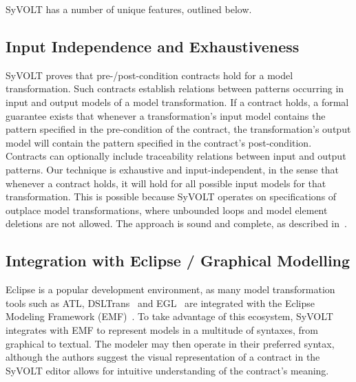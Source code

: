 SyVOLT has a number of unique features, outlined below.

\subsection{Input Independence and Exhaustiveness} 

SyVOLT proves that pre-/post-condition contracts hold for a model transformation.
Such contracts establish relations between patterns occurring in input and output
models of a model transformation. If a contract holds, a formal guarantee
exists that whenever a transformation's input model contains the pattern
specified in the pre-condition of the contract, the transformation's output model will contain
the pattern specified in the contract's post-condition. Contracts can 
optionally include traceability relations between input and output patterns. 
Our technique is exhaustive and input-independent, in the sense that whenever a contract holds, it
will hold for all possible input models for that transformation. This is possible
because SyVOLT operates on specifications of outplace model transformations,
where unbounded loops and model element deletions are not allowed. The approach is sound and complete, as described
in~\cite{Lucio2014}.




\subsection{Integration with Eclipse / Graphical Modelling}

Eclipse is a popular development environment, as many model transformation tools
such as ATL, DSLTrans~\cite{Barroca2011} and
EGL~\cite{eglTool} are integrated with the Eclipse
Modeling Framework (EMF)~\cite{emfTool}. To take
advantage of this ecosystem, SyVOLT integrates with EMF to represent models in a
multitude of syntaxes, from graphical to textual. The modeler may then operate
in their preferred syntax, although the authors suggest the visual
representation of a contract in the SyVOLT editor allows for intuitive
understanding of the contract's meaning.




